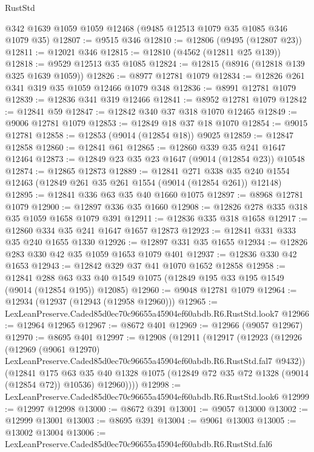 \begin{lexlean}{RustStd}
\begin{coremodule}
    @342
    @1639
    @1059
    @1059
    @12468
    (@9485 @12513 @1079 @35 @1085 @346 @1079 @35)
@12807 := @9515 @346
@12810 := @12806 (@9495 (@12807 @23))
@12811 := @12021 @346
@12815 := @12810 (@4562 (@12811 @25 @139))
@12818 := @9529 @12513 @35 @1085
@12824 := @12815 (@8916 (@12818 @139 @325 @1639 @1059))
@12826 := @8977 @12781 @1079
@12834 := @12826 @261 @341 @319 @35 @1059 @12466 @1079 @348
@12836 := @8991 @12781 @1079
@12839 := @12836 @341 @319 @12466
@12841 := @8952 @12781 @1079
@12842 := @12841 @59
@12847 := @12842 @340 @37 @318 @1070 @12465
@12849 := @9006 @12781 @1079
@12853 := @12849 @18 @37 @18 @1070
@12854 := @9015 @12781
@12858 := @12853 (@9014 (@12854 @18)) @9025
@12859 := @12847 @12858
@12860 := @12841 @61
@12865 := @12860 @339 @35 @241 @1647 @12464
@12873 := @12849 @23 @35 @23 @1647 (@9014 (@12854 @23)) @10548
@12874 := @12865 @12873
@12889 := @12841
    @271
    @338
    @35
    @240
    @1554
    @12463
    (@12849 @261 @35 @261 @1554 (@9014 (@12854 @261)) @12148)
@12895 := @12841 @336 @63 @35 @40 @1660 @1075
@12897 := @8968 @12781 @1079
@12900 := @12897 @336 @35 @1660
@12908 := @12826 @278 @335 @318 @35 @1059 @1658 @1079 @391
@12911 := @12836 @335 @318 @1658
@12917 := @12860 @334 @35 @241 @1647 @1657 @12873
@12923 := @12841 @331 @333 @35 @240 @1655 @1330
@12926 := @12897 @331 @35 @1655
@12934 := @12826 @283 @330 @42 @35 @1059 @1653 @1079 @401
@12937 := @12836 @330 @42 @1653
@12943 := @12842 @329 @37 @41 @1070 @1652 @12858
@12958 := @12841
    @288
    @63
    @33
    @40
    @1549
    @1075
    (@12849 @195 @33 @195 @1549 (@9014 (@12854 @195)) @12085)
@12960 := @9048 @12781 @1079
@12964 := @12934 (@12937 (@12943 (@12958 @12960)))
@12965 := LexLeanPreserve.Caded85d0ec70c96655a45904ef60abdb.R6.RustStd.look7
@12966 := @12964 @12965
@12967 := @8672 @401
@12969 := @12966 (@9057 @12967)
@12970 := @8695 @401
@12997 := @12908
    (@12911
      (@12917
        (@12923
          (@12926
            (@12969
              (@9061 @12970)
              LexLeanPreserve.Caded85d0ec70c96655a45904ef60abdb.R6.RustStd.fal7
              @9432))
          (@12841
            @175
            @63
            @35
            @40
            @1328
            @1075
            (@12849 @72 @35 @72 @1328 (@9014 (@12854 @72)) @10536)
            @12960))))
@12998 := LexLeanPreserve.Caded85d0ec70c96655a45904ef60abdb.R6.RustStd.look6
@12999 := @12997 @12998
@13000 := @8672 @391
@13001 := @9057 @13000
@13002 := @12999 @13001
@13003 := @8695 @391
@13004 := @9061 @13003
@13005 := @13002 @13004
@13006 := LexLeanPreserve.Caded85d0ec70c96655a45904ef60abdb.R6.RustStd.fal6

\end{coremodule}
\end{lexlean}
